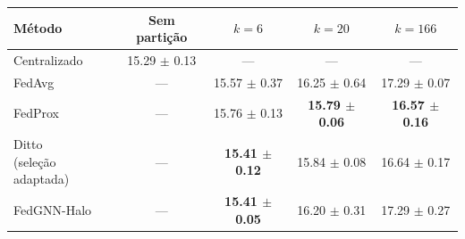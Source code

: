 
\begin{tabular}{lcccc}
\toprule
Método & Sem partição & $k=6$ & $k=20$ & $k=166$ \\
\midrule
Centralizado & \num{15.29} $\pm$ \num{0.13} & --- & --- & --- \\
\midrule
FedAvg & --- & \num{15.57} $\pm$ \num{0.37} & \num{16.25} $\pm$ \num{0.64} & \num{17.29} $\pm$ \num{0.07} \\
FedProx & --- & \num{15.76} $\pm$ \num{0.13} & \textbf{\boldmath\sisetup{mode=text,detect-weight=true}\num{15.79} $\pm$ \num{0.06}} & \textbf{\boldmath\sisetup{mode=text,detect-weight=true}\num{16.57} $\pm$ \num{0.16}} \\
\shortstack[l]{Ditto\\(seleção adaptada)} & --- & \textbf{\boldmath\sisetup{mode=text,detect-weight=true}\num{15.41} $\pm$ \num{0.12}} & \num{15.84} $\pm$ \num{0.08} & \num{16.64} $\pm$ \num{0.17} \\
FedGNN-Halo & --- & \textbf{\boldmath\sisetup{mode=text,detect-weight=true}\num{15.41} $\pm$ \num{0.05}} & \num{16.20} $\pm$ \num{0.31} & \num{17.29} $\pm$ \num{0.27} \\
\bottomrule
\end{tabular}
